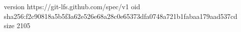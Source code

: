 version https://git-lfs.github.com/spec/v1
oid sha256:f2c90818a5b5f3a62e526e68a28c0e65373dfa0748a721b1fabaa179aad537cd
size 2105
